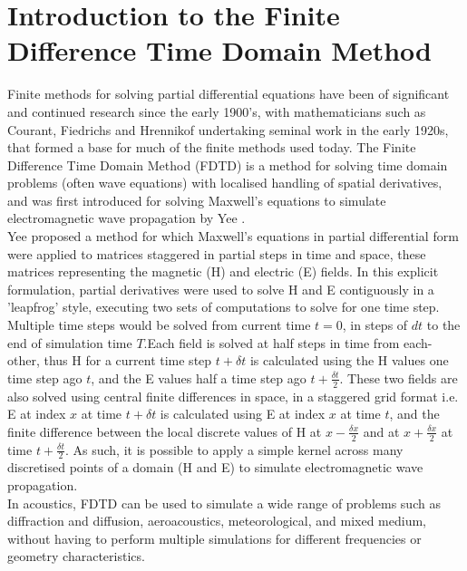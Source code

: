 \section{Introduction to the Finite Difference Time Domain Method}
Finite methods for solving partial differential equations have been of significant and continued research since the early 1900's, with mathematicians such as Courant, Fiedrichs and Hrennikof undertaking seminal work in the early 1920s, that formed a base for much of the finite methods used today. The Finite Difference Time Domain Method (FDTD) is a method for solving time domain problems (often wave equations) with localised handling of spatial derivatives, and was first introduced for solving Maxwell's equations to simulate electromagnetic wave propagation by Yee \cite{Yee1966}.\\
Yee proposed a method for which Maxwell's equations in partial differential form were applied to matrices staggered in partial steps in time and space, these matrices representing the magnetic (H) and electric (E) fields. In this explicit formulation, partial derivatives were used to solve H and E contiguously in a 'leapfrog' style, executing two sets of computations to solve for one time step. Multiple time steps would be solved from current time $t = 0$, in steps of $dt$ to the end of simulation time $T$.Each field is solved at half steps in time from each-other, thus H for a current time step $t + \delta t$ is calculated using the H values one time step ago $t$, and the E values half a time step ago $t + \frac{\delta t}{2} $. These two fields are also solved using central finite differences in space, in a staggered grid format i.e. E at index $x$ at time $t + \delta t$ is calculated using E at index $x$ at time $t$, and the finite difference between the local discrete values of H at $x - \frac{\delta x}{2} $ and at $x + \frac{\delta x}{2} $ at time $t + \frac{\delta t}{2}$. As such, it is possible to apply a simple kernel across many discretised points of a domain (H and E) to simulate electromagnetic wave propagation.\\
In acoustics, FDTD can be used to simulate a wide range of problems such as diffraction and diffusion, aeroacoustics, meteorological, and mixed medium, without having to perform multiple simulations for different frequencies or geometry characteristics.

